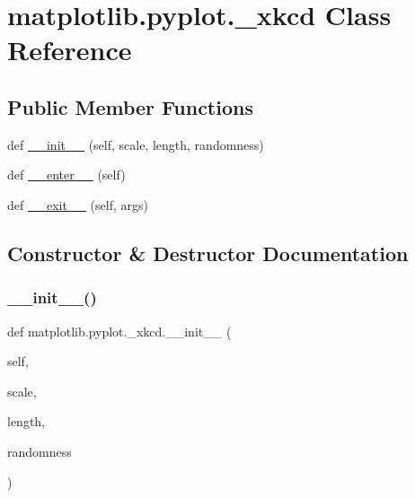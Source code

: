 \hypertarget{classmatplotlib_1_1pyplot_1_1__xkcd}{}\section{matplotlib.\+pyplot.\+\_\+xkcd Class Reference}
\label{classmatplotlib_1_1pyplot_1_1__xkcd}
\subsection*{Public Member Functions}
\begin{DoxyCompactItemize}
\item 
def \hyperlink{classmatplotlib_1_1pyplot_1_1__xkcd_a1cb5e9ec58f0470fc43996af025b503a}{\+\_\+\+\_\+init\+\_\+\+\_\+} (self, scale, length, randomness)
\item 
def \hyperlink{classmatplotlib_1_1pyplot_1_1__xkcd_a23c9ac9467f46e9b7331241d155487de}{\+\_\+\+\_\+enter\+\_\+\+\_\+} (self)
\item 
def \hyperlink{classmatplotlib_1_1pyplot_1_1__xkcd_a58365370303ff11b274d2ae84744da07}{\+\_\+\+\_\+exit\+\_\+\+\_\+} (self, args)
\end{DoxyCompactItemize}


\subsection{Constructor \& Destructor Documentation}
\mbox{\label{classmatplotlib_1_1pyplot_1_1__xkcd_a1cb5e9ec58f0470fc43996af025b503a}} 
\subsubsection{\texorpdfstring{\+\_\+\+\_\+init\+\_\+\+\_\+()}{\_\_init\_\_()}}
{\footnotesize\ttfamily def matplotlib.\+pyplot.\+\_\+xkcd.\+\_\+\+\_\+init\+\_\+\+\_\+ (\begin{DoxyParamCaption}\item[{}]{self,  }\item[{}]{scale,  }\item[{}]{length,  }\item[{}]{randomness }\end{DoxyParamCaption})}



